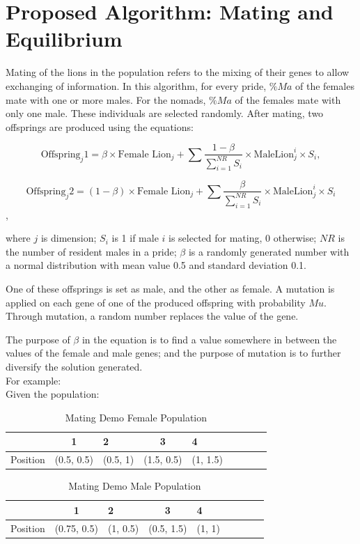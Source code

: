 \section{Proposed Algorithm: Mating and Equilibrium}
Mating of the lions in the population refers to the mixing of their genes to allow exchanging of information. In this algorithm, for every pride, $\%Ma$ of the females mate with one or more males. For the nomads, $\%Ma$ of the females mate with only one male. These individuals are selected randomly. After mating, two offsprings are produced using the equations:

$$\text{Offspring}_j\text{1}=\beta \times \text{Female Lion}_j +\sum\frac{1-\beta}{\sum_{i=1}^{NR}S_i}\times\text{MaleLion}_j^i\times S_i,$$

$$\text{Offspring}_j\text{2}=(1-\beta) \times \text{Female Lion}_j +\sum\frac{\beta}{\sum_{i=1}^{NR}S_i}\times\text{MaleLion}_j^i\times S_i$$,

where $j$ is dimension; $S_i$ is 1 if male $i$ is selected for mating, 0 otherwise; $NR$ is the number of resident males in a pride; $\beta$ is a randomly generated number with a normal distribution with mean value 0.5 and standard deviation 0.1.

One of these offsprings is set as male, and the other as female. A mutation is applied on each gene of one of the produced offspring with probability $Mu$. Through mutation, a random number replaces the value of the gene.

The purpose of $\beta$ in the equation is to find a value somewhere in between the values of the female and male genes; and the purpose of mutation is to further diversify the solution generated.
\\For example:
\\Given the population:

\begin{table}[h!]
\centering
\begin{tabular}{l c l c l c l c l}
\hline
  & 1          & 2        & 3          & 4        \\
\hline
Position    & (0.5, 0.5) & (0.5, 1) & (1.5, 0.5) & (1, 1.5) \\
\hline
\end{tabular}
\caption{Mating Demo Female Population}
\end{table}

\begin{table}[h!]
\centering
\begin{tabular}{l c l c l c l c l}
\hline
  & 1          & 2        & 3          & 4        \\
\hline
Position    & (0.75, 0.5) & (1, 0.5) & (0.5, 1.5) & (1, 1) \\
\hline
\end{tabular}
\caption{Mating Demo Male Population}
\end{table}

